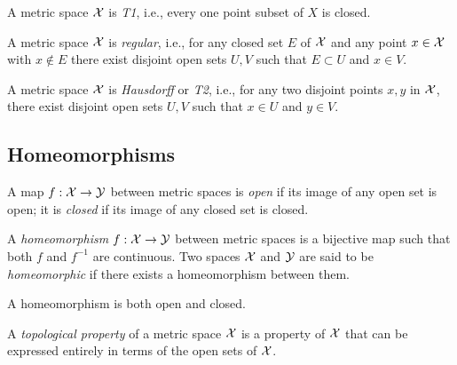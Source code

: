 \begin{coro}
  \label{coro:metricSpaceIsT1}
  A metric space ${\cal X}$ is \emph{T1},
  i.e., every one point subset of $X$ is closed.
\end{coro}

\begin{coro}
  \label{coro:metricSpaceIsRegular}
  A metric space ${\cal X}$ is \emph{regular},
  i.e., 
  for any closed set $E$ of ${\cal X}$
  and any point $x\in{\cal X}$ with $x\not\in E$
  there exist disjoint open sets $U,V$
  such that $E\subset U$ and $x\in V$.
\end{coro}

\begin{coro}
  \label{coro:metricSpaceIsT2}
  A metric space ${\cal X}$ is \emph{Hausdorff} or \emph{T2},
  i.e., 
  for any two disjoint points $x,y$ in ${\cal X}$,
  there exist disjoint open sets $U,V$
  such that $x\in U$ and $y\in V$.
\end{coro}

\subsection{Homeomorphisms}
\label{sec:homeomorphisms}

\begin{defn}
  \label{def:openMap}
  A map $f:{\cal X}\rightarrow {\cal Y}$ between metric spaces is \emph{open}
  if its image of any open set is open; 
  it is \emph{closed} if its image of any closed set is closed. 
\end{defn}

\begin{defn}
  A \emph{homeomorphism} $f:{\cal X}\rightarrow {\cal Y}$
  between metric spaces
  is a bijective map such that both $f$ and $f^{-1}$
  are continuous.
  Two spaces ${\cal X}$ and ${\cal Y}$
  are said to be \emph{homeomorphic}
  if there exists a homeomorphism between them.
\end{defn}

\begin{lem}
  \label{lem:homeomorphismIsOpenAndClosed}
  A homeomorphism is both open and closed.
\end{lem}

\begin{defn}
  \label{def:topologicalProperty}
  A \emph{topological property} of a metric space ${\cal X}$
  is a property of ${\cal X}$
  that can be expressed entirely in terms of
  the open sets of ${\cal X}$.
\end{defn}

